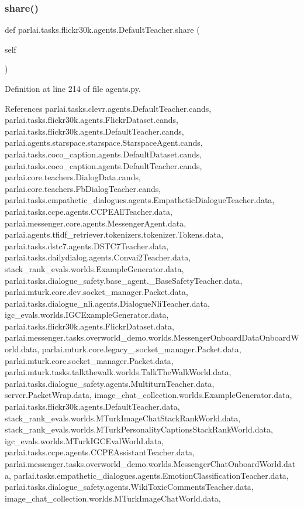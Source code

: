 \subsubsection{\texorpdfstring{share()}{share()}}
{\footnotesize\ttfamily def parlai.\+tasks.\+flickr30k.\+agents.\+Default\+Teacher.\+share (\begin{DoxyParamCaption}\item[{}]{self }\end{DoxyParamCaption})}



Definition at line 214 of file agents.\+py.



References parlai.\+tasks.\+clevr.\+agents.\+Default\+Teacher.\+cands, parlai.\+tasks.\+flickr30k.\+agents.\+Flickr\+Dataset.\+cands, parlai.\+tasks.\+flickr30k.\+agents.\+Default\+Teacher.\+cands, parlai.\+agents.\+starspace.\+starspace.\+Starspace\+Agent.\+cands, parlai.\+tasks.\+coco\+\_\+caption.\+agents.\+Default\+Dataset.\+cands, parlai.\+tasks.\+coco\+\_\+caption.\+agents.\+Default\+Teacher.\+cands, parlai.\+core.\+teachers.\+Dialog\+Data.\+cands, parlai.\+core.\+teachers.\+Fb\+Dialog\+Teacher.\+cands, parlai.\+tasks.\+empathetic\+\_\+dialogues.\+agents.\+Empathetic\+Dialogue\+Teacher.\+data, parlai.\+tasks.\+ccpe.\+agents.\+C\+C\+P\+E\+All\+Teacher.\+data, parlai.\+messenger.\+core.\+agents.\+Messenger\+Agent.\+data, parlai.\+agents.\+tfidf\+\_\+retriever.\+tokenizers.\+tokenizer.\+Tokens.\+data, parlai.\+tasks.\+dstc7.\+agents.\+D\+S\+T\+C7\+Teacher.\+data, parlai.\+tasks.\+dailydialog.\+agents.\+Convai2\+Teacher.\+data, stack\+\_\+rank\+\_\+evals.\+worlds.\+Example\+Generator.\+data, parlai.\+tasks.\+dialogue\+\_\+safety.\+base\+\_\+agent.\+\_\+\+Base\+Safety\+Teacher.\+data, parlai.\+mturk.\+core.\+dev.\+socket\+\_\+manager.\+Packet.\+data, parlai.\+tasks.\+dialogue\+\_\+nli.\+agents.\+Dialogue\+Nli\+Teacher.\+data, igc\+\_\+evals.\+worlds.\+I\+G\+C\+Example\+Generator.\+data, parlai.\+tasks.\+flickr30k.\+agents.\+Flickr\+Dataset.\+data, parlai.\+messenger.\+tasks.\+overworld\+\_\+demo.\+worlds.\+Messenger\+Onboard\+Data\+Onboard\+World.\+data, parlai.\+mturk.\+core.\+legacy\+\_.\+socket\+\_\+manager.\+Packet.\+data, parlai.\+mturk.\+core.\+socket\+\_\+manager.\+Packet.\+data, parlai.\+mturk.\+tasks.\+talkthewalk.\+worlds.\+Talk\+The\+Walk\+World.\+data, parlai.\+tasks.\+dialogue\+\_\+safety.\+agents.\+Multiturn\+Teacher.\+data, server.\+Packet\+Wrap.\+data, image\+\_\+chat\+\_\+collection.\+worlds.\+Example\+Generator.\+data, parlai.\+tasks.\+flickr30k.\+agents.\+Default\+Teacher.\+data, stack\+\_\+rank\+\_\+evals.\+worlds.\+M\+Turk\+Image\+Chat\+Stack\+Rank\+World.\+data, stack\+\_\+rank\+\_\+evals.\+worlds.\+M\+Turk\+Personality\+Captions\+Stack\+Rank\+World.\+data, igc\+\_\+evals.\+worlds.\+M\+Turk\+I\+G\+C\+Eval\+World.\+data, parlai.\+tasks.\+ccpe.\+agents.\+C\+C\+P\+E\+Assistant\+Teacher.\+data, parlai.\+messenger.\+tasks.\+overworld\+\_\+demo.\+worlds.\+Messenger\+Chat\+Onboard\+World.\+data, parlai.\+tasks.\+empathetic\+\_\+dialogues.\+agents.\+Emotion\+Classification\+Teacher.\+data, parlai.\+tasks.\+dialogue\+\_\+safety.\+agents.\+Wiki\+Toxic\+Comments\+Teacher.\+data, image\+\_\+chat\+\_\+collection.\+worlds.\+M\+Turk\+Image\+Chat\+World.\+data, 